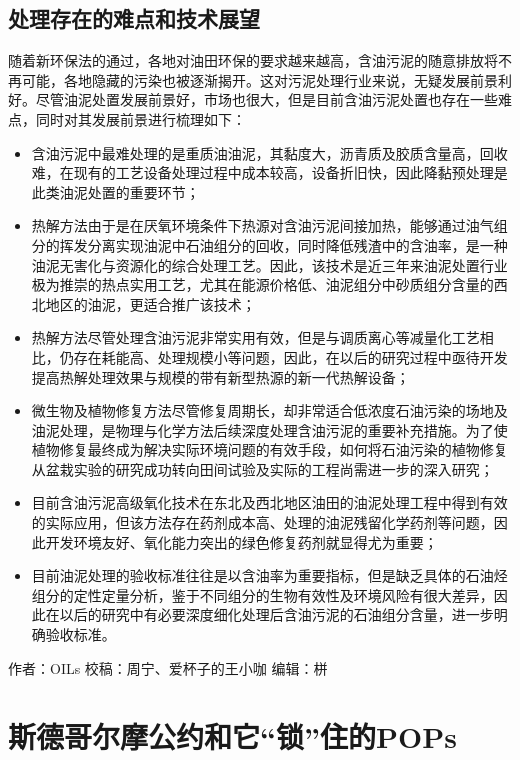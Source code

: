 \documentclass[]{book}
\begin{document}
\hypertarget{ux5904ux7406ux5b58ux5728ux7684ux96beux70b9ux548cux6280ux672fux5c55ux671b}{%
\subsection{处理存在的难点和技术展望}\label{ux5904ux7406ux5b58ux5728ux7684ux96beux70b9ux548cux6280ux672fux5c55ux671b}}

随着新环保法的通过，各地对油田环保的要求越来越高，含油污泥的随意排放将不再可能，各地隐藏的污染也被逐渐揭开。这对污泥处理行业来说，无疑发展前景利好。尽管油泥处置发展前景好，市场也很大，但是目前含油污泥处置也存在一些难点，同时对其发展前景进行梳理如下：

\begin{itemize}
\item
  含油污泥中最难处理的是重质油油泥，其黏度大，沥青质及胶质含量高，回收难，在现有的工艺设备处理过程中成本较高，设备折旧快，因此降黏预处理是此类油泥处置的重要环节；
\item
  热解方法由于是在厌氧环境条件下热源对含油污泥间接加热，能够通过油气组分的挥发分离实现油泥中石油组分的回收，同时降低残渣中的含油率，是一种油泥无害化与资源化的综合处理工艺。因此，该技术是近三年来油泥处置行业极为推崇的热点实用工艺，尤其在能源价格低、油泥组分中砂质组分含量的西北地区的油泥，更适合推广该技术；
\item
  热解方法尽管处理含油污泥非常实用有效，但是与调质离心等减量化工艺相比，仍存在耗能高、处理规模小等问题，因此，在以后的研究过程中亟待开发提高热解处理效果与规模的带有新型热源的新一代热解设备；
\item
  微生物及植物修复方法尽管修复周期长，却非常适合低浓度石油污染的场地及油泥处理，是物理与化学方法后续深度处理含油污泥的重要补充措施。为了使植物修复最终成为解决实际环境问题的有效手段，如何将石油污染的植物修复从盆栽实验的研究成功转向田间试验及实际的工程尚需进一步的深入研究；
\item
  目前含油污泥高级氧化技术在东北及西北地区油田的油泥处理工程中得到有效的实际应用，但该方法存在药剂成本高、处理的油泥残留化学药剂等问题，因此开发环境友好、氧化能力突出的绿色修复药剂就显得尤为重要；
\item
  目前油泥处理的验收标准往往是以含油率为重要指标，但是缺乏具体的石油烃组分的定性定量分析，鉴于不同组分的生物有效性及环境风险有很大差异，因此在以后的研究中有必要深度细化处理后含油污泥的石油组分含量，进一步明确验收标准。
\end{itemize}

作者：OILs
校稿：周宁、爱杯子的王小咖
编辑：栟

\hypertarget{ux65afux5fb7ux54e5ux5c14ux6469ux516cux7ea6ux548cux5b83ux9501ux4f4fux7684pops}{%
\section{斯德哥尔摩公约和它``锁''住的POPs}\label{ux65afux5fb7ux54e5ux5c14ux6469ux516cux7ea6ux548cux5b83ux9501ux4f4fux7684pops}}
\end{document}
